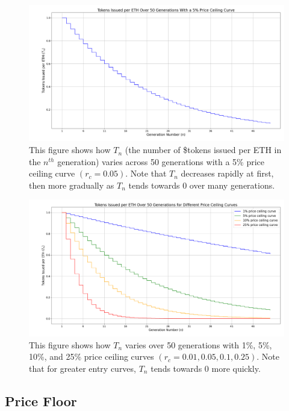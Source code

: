 \documentclass{article}
\begin{document}
\begin{figure}[h]
  \centering
  \includegraphics[width=\textwidth]{figures/single-ceiling-curve.png}
   \caption{This figure shows how $T_n$ (the number of \$tokens issued per ETH in the $n^{th}$ generation) varies across 50 generations with a 5\% price ceiling curve $(r_c = 0.05)$. Note that $T_n$ decreases rapidly at first, then more gradually as $T_n$ tends towards 0 over many generations.}
\end{figure}

\clearpage
\begin{figure}[h]
  \centering
  \includegraphics[width=\textwidth]{figures/multi-ceiling-curves.png}
  \caption{This figure shows how $T_n$ varies over 50 generations with 1\%, 5\%, 10\%, and 25\% price ceiling curves $(r_c = 0.01, 0.05, 0.1, 0.25)$. Note that for greater entry curves, $T_n$ tends towards 0 more quickly.}
\end{figure}

\subsection{Price Floor}
\end{document}
